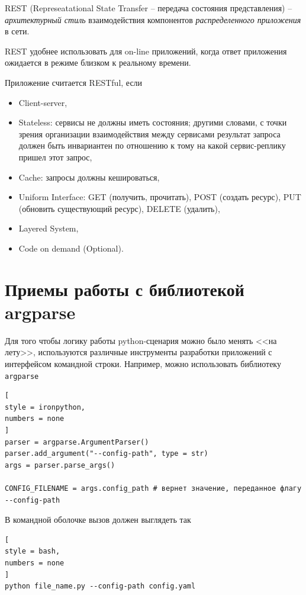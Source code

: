 \documentclass[%
	11pt,
	a4paper,
	utf8,
		]{article}
\begin{document}
REST (Represeatational State Transfer -- передача состояния представления) -- \emph{архитектурный стиль} взаимодействия компонентов \emph{распределенного приложения} в сети.

REST удобнее использовать для on-line приложений, когда ответ приложения ожидается в режиме близком к реальному времени.

Приложение считается RESTful, если
\begin{itemize}
	\item Client-server,
	
	\item Stateless: сервисы не должны иметь состояния; другими словами, с точки зрения организации взаимодействия между сервисами результат запроса должен быть инвариантен по отношению к тому на какой сервис-реплику пришел этот запрос,
	
	\item Cache: запросы должны кешироваться,
	
	\item Uniform Interface: GET (получить, прочитать), POST (создать ресурс), PUT (обновить существующий ресурс), DELETE (удалить),
	
	\item Layered System,
	
	\item Code on demand (Optional).
\end{itemize}


\section{Приемы работы с библиотекой argparse}

Для того чтобы логику работы python-сценария можно было менять <<на лету>>, используются различные инструменты разработки приложений с интерфейсом командной строки. Например, можно использовать библиотеку \texttt{argparse} 
\begin{lstlisting}[
style = ironpython,
numbers = none	
]
parser = argparse.ArgumentParser()
parser.add_argument("--config-path", type = str)
args = parser.parse_args()

CONFIG_FILENAME = args.config_path # вернет значение, переданное флагу --config-path
\end{lstlisting}

В командной оболочке вызов должен выглядеть так
\begin{lstlisting}[
style = bash,
numbers = none
]
python file_name.py --config-path config.yaml
\end{lstlisting}
\end{document}
